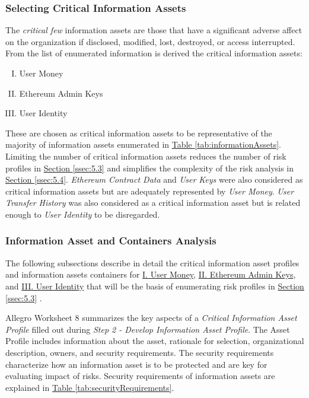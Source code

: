 \documentclass[12pt]{article} %
\newcommand{\hypertableref}[1]{\hyperref[#1]{Table \ref{#1}}}
\newcommand{\hypersectionref}[1]{\hyperref[#1]{Section \ref{#1}}}
\begin{document}
{\subsubsection{Selecting Critical Information Assets} \label{sssec:5.2:criticalAssets}

The \textit{critical few} information assets are those that have a significant adverse affect on the organization if disclosed, modified, lost, destroyed, or access interrupted. From the list of enumerated information is derived the critical information assets:

\begin{enumerate}[(I)] \label{enum:criticalInformationAssets}
	\item User Money
	\item Ethereum Admin Keys
	\item User Identity
\end{enumerate}

These are chosen as critical information assets to be representative of the majority of information assets enumerated in \hypertableref{tab:informationAssets}. Limiting the number of critical information assets reduces the number of risk profiles in \hypersectionref{ssec:5.3} and simplifies the complexity of the risk analysis in \hypersectionref{ssec:5.4}. \textit{Ethereum Contract Data} and \textit{User Keys} were also considered as critical information assets but are adequately represented by \textit{User Money}. \textit{User Transfer History} was also considered as a critical information asset but is related enough to \textit{User Identity} to be disregarded.

\subsubsection{Information Asset and Containers Analysis} \label{sssec:5.2:analysis}

The following subsections describe in detail the critical information asset profiles and information assets containers for \hyperref[sssec:5.2:userMoney]{I. User Money}, \hyperref[sssec:5.2:ethereumAdminKeys]{II. Ethereum Admin Keys}, and \hyperref[sssec:5.2:userIdentity]{III. User Identity} that will be the basis of enumerating risk profiles in \hypersectionref{ssec:5.3} .

Allegro Worksheet 8 summarizes the key aspects of a \textit{Critical Information Asset Profile} filled out during \textit{Step 2 - Develop Information Asset Profile}. The Asset Profile includes information about the asset, rationale for selection, organizational description, owners, and security requirements. The security requirements characterize how an information asset is to be protected and are key for evaluating impact of risks. Security requirements of information assets are explained in \hypertableref{tab:securityRequirements}.

}
\end{document}
